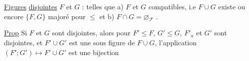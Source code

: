 \uline{Figures} \uline{disjointes}  \uline{$F$} et \uline{$G$} : telles que a) $F$ et $G$ compatibles, i.e $F\cup G$ existe  ou encore $\{F,G\}$ majoré pour $\leq$ et b) $F\cap G=\varnothing_{\mathcal F}$  .


 \uline{Prop} Si $F$ et $G$ sont disjointes, alors pour $F'\leq F$, $G'\leq G$, $F'_{a}$ et $G'$ sont disjointes, et $F'\cup G'$ est une sous figure de $F\cup G$, l'application $(F';G')\mapsto F'\cup G'$ est une bijection 
